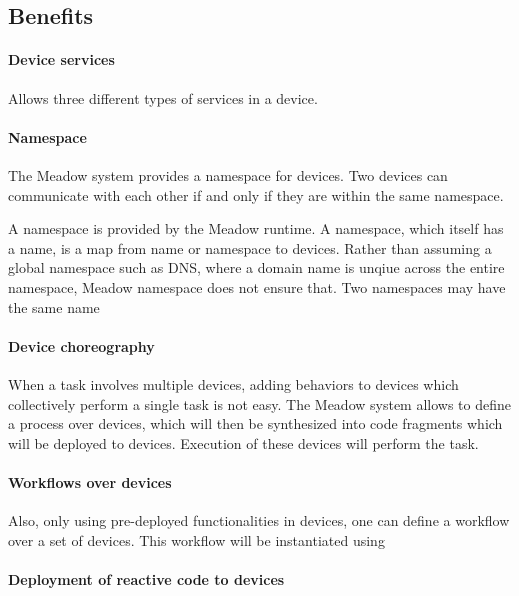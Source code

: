\documentclass{note}
\begin{document}
\subsection{Benefits}

\paragraph{Device services}
Allows three different types of services in a device.


\paragraph{Namespace}
The Meadow system provides a namespace for devices. 
Two devices can communicate with each other if and only if they are 
within the same namespace.





A namespace is provided by the Meadow runtime. 
A namespace, which itself has a name, is a map from name or namespace
to devices. 
Rather than assuming a global namespace such as DNS, where a domain name is 
unqiue across the entire namespace, Meadow namespace does not ensure that.
Two namespaces may have the same name 





\paragraph{Device choreography}
When a task involves multiple devices, adding behaviors to devices
  which collectively perform a single task is not easy. The Meadow system
  allows to define a process over devices, which will then be synthesized into
  code fragments which will be deployed to devices. Execution of these devices
  will perform the task.

\paragraph{Workflows over devices}
Also, only using pre-deployed functionalities in devices, one can define a
workflow over a set of devices. This workflow will be instantiated using 

\paragraph{Deployment of reactive code to devices}
\end{document}
